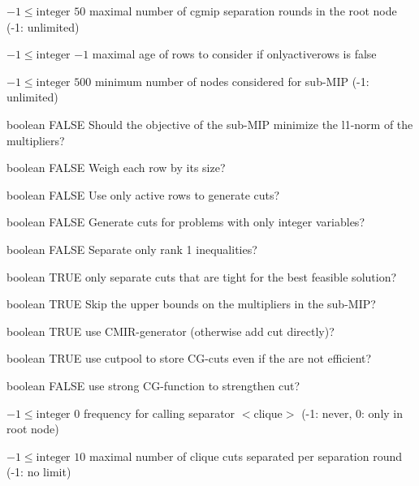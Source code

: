 %
{$-1\leq\textrm{integer}$}%
{$50$}%
{maximal number of cgmip separation rounds in the root node (-1: unlimited)}%
{}

%
{$-1\leq\textrm{integer}$}%
{$-1$}%
{maximal age of rows to consider if onlyactiverows is false}%
{}

%
{$-1\leq\textrm{integer}$}%
{$500$}%
{minimum number of nodes considered for sub-MIP (-1: unlimited)}%
{}

%
{boolean}%
{FALSE}%
{Should the objective of the sub-MIP minimize the l1-norm of the multipliers?}%
{}

%
{boolean}%
{FALSE}%
{Weigh each row by its size?}%
{}

%
{boolean}%
{FALSE}%
{Use only active rows to generate cuts?}%
{}

%
{boolean}%
{FALSE}%
{Generate cuts for problems with only integer variables?}%
{}

%
{boolean}%
{FALSE}%
{Separate only rank 1 inequalities?}%
{}

%
{boolean}%
{TRUE}%
{only separate cuts that are tight for the best feasible solution?}%
{}

%
{boolean}%
{TRUE}%
{Skip the upper bounds on the multipliers in the sub-MIP?}%
{}

%
{boolean}%
{TRUE}%
{use CMIR-generator (otherwise add cut directly)?}%
{}

%
{boolean}%
{TRUE}%
{use cutpool to store CG-cuts even if the are not efficient?}%
{}

%
{boolean}%
{FALSE}%
{use strong CG-function to strengthen cut?}%
{}

%
{$-1\leq\textrm{integer}$}%
{$0$}%
{frequency for calling separator $<$clique$>$ (-1: never, 0: only in root node)}%
{}

%
{$-1\leq\textrm{integer}$}%
{$10$}%
{maximal number of clique cuts separated per separation round (-1: no limit)}%
{}

